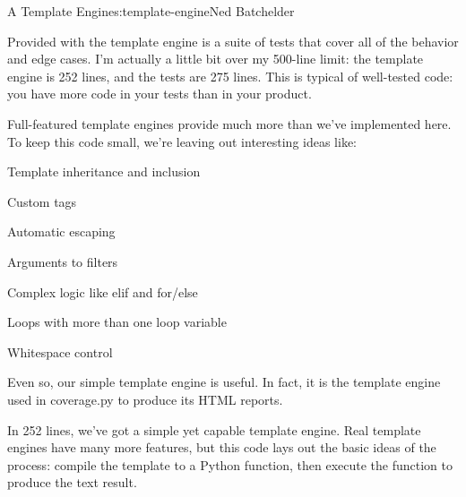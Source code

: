 \begin{aosachapter}{A Template Engine}{s:template-engine}{Ned Batchelder}
\label{testing}

Provided with the template engine is a suite of tests that cover all of
the behavior and edge cases. I'm actually a little bit over my 500-line
limit: the template engine is 252 lines, and the tests are 275 lines.
This is typical of well-tested code: you have more code in your tests
than in your product.

\label{whats-left-out}

Full-featured template engines provide much more than we've implemented
here. To keep this code small, we're leaving out interesting ideas like:

\begin{aosaitemize}

\item
  Template inheritance and inclusion
\item
  Custom tags
\item
  Automatic escaping
\item
  Arguments to filters
\item
  Complex logic like elif and for/else
\item
  Loops with more than one loop variable
\item
  Whitespace control
\end{aosaitemize}

Even so, our simple template engine is useful. In fact, it is the
template engine used in coverage.py to produce its HTML reports.

\label{summing-up}

In 252 lines, we've got a simple yet capable template engine. Real
template engines have many more features, but this code lays out the
basic ideas of the process: compile the template to a Python function,
then execute the function to produce the text result.

\end{aosachapter}
